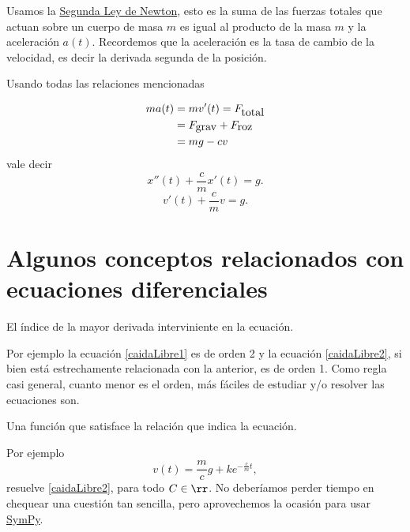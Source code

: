  Usamos la \href{http://es.wikipedia.org/wiki/Leyes_de_Newton}{Segunda Ley de Newton}, esto es la suma de las fuerzas totales que actuan sobre un cuerpo de masa $m$
es igual al producto de la masa $m$ y la aceleración $a(t)$.
Recordemos que la aceleración es la tasa de cambio de la velocidad, es decir la derivada 
segunda de la posición.   

  Usando todas las relaciones mencionadas

\[\begin{split} ma(t)&=mv'(t)=F_{\hbox{total}}\\
  &=F_{\hbox{grav}}+F_{\hbox{roz}}\\
  &=mg-cv
\end{split}
\]
vale decir
\begin{equation}\label{caidaLibre1}
 \boxed{ x''(t)+\frac{c}{m} x'(t)=g.}
\end{equation}
\begin{equation}\label{caidaLibre2}
\boxed{ v'(t)+\frac{c}{m} v=g.}
\end{equation}





\section{Algunos conceptos relacionados con ecuaciones diferenciales}

\begin{definicion}[Orden]{} El índice de la mayor derivada interviniente en la ecuación.
 \end{definicion}

 Por ejemplo la ecuación \eqref{caidaLibre1} es de orden 2 y la
ecuación \eqref{caidaLibre2}, si bien está estrechamente relacionada con la anterior, es de orden 1. Como regla casi general, cuanto menor es el orden,  más fáciles de estudiar y/o resolver las ecuaciones son.

  \begin{definicion}[Solución]{} Una función que satisface la relación que indica la ecuación.

   \end{definicion}

   Por ejemplo
\begin{equation}\label{SolGencaidaLibre2} v(t)=\frac{m}{c}g+ke^{-\frac{c}{m}t},\end{equation}
resuelve \eqref{caidaLibre2}, para todo $C\in\rr$. No deberíamos perder tiempo en chequear una cuestión tan sencilla, pero aprovechemos la ocasión para usar  \href{http://www.sympy.org}{SymPy}.





